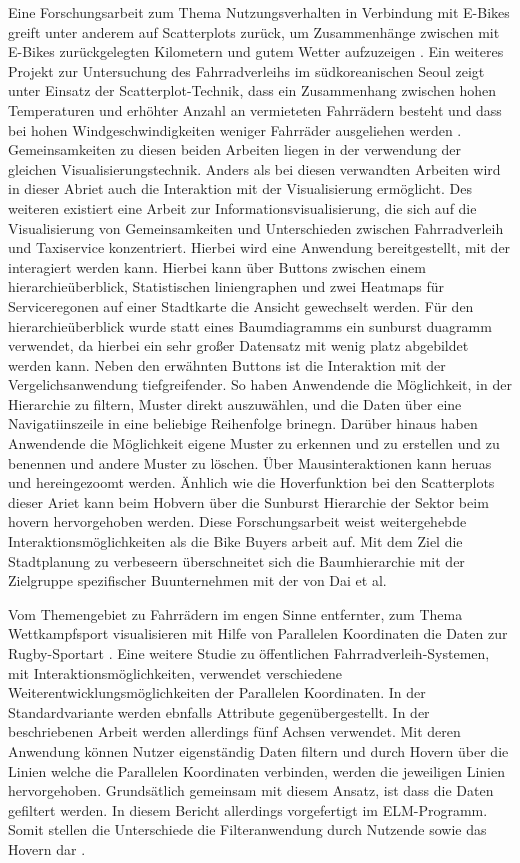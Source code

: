 \documentclass[usegeometry=true]{scrartcl}
\begin{document}
Eine Forschungsarbeit zum Thema Nutzungsverhalten in Verbindung mit E-Bikes greift unter anderem auf Scatterplots zurück, um Zusammenhänge zwischen mit E-Bikes zurückgelegten Kilometern und gutem Wetter aufzuzeigen \cite{Rios.06212016}. Ein weiteres Projekt zur Untersuchung des Fahrradverleihs im südkoreanischen Seoul zeigt unter Einsatz der Scatterplot-Technik, dass ein Zusammenhang zwischen hohen Temperaturen und erhöhter Anzahl an vermieteten Fahrrädern besteht und dass bei hohen Windgeschwindigkeiten weniger Fahrräder ausgeliehen werden \cite{Kashyap.2021}. Gemeinsamkeiten zu diesen beiden Arbeiten liegen in der verwendung der gleichen Visualisierungstechnik. Anders als bei diesen verwandten Arbeiten wird in dieser Abriet auch die Interaktion mit der Visualisierung ermöglicht. 
Des weiteren existiert eine Arbeit zur Informationsvisualisierung, die sich auf die Visualisierung von Gemeinsamkeiten und Unterschieden zwischen Fahrradverleih und Taxiservice konzentriert. Hierbei wird eine Anwendung bereitgestellt, mit der interagiert werden kann. Hierbei kann über Buttons zwischen einem hierarchieüberblick, Statistischen liniengraphen und zwei Heatmaps für Serviceregonen auf einer Stadtkarte die Ansicht gewechselt werden. Für den hierarchieüberblick wurde statt eines Baumdiagramms ein sunburst duagramm verwendet, da hierbei ein sehr großer Datensatz mit wenig platz abgebildet werden kann. Neben den erwähnten Buttons ist die Interaktion mit der Vergelichsanwendung tiefgreifender. So haben Anwendende die Möglichkeit, in der Hierarchie zu filtern, Muster direkt auszuwählen, und die Daten über eine Navigatiinszeile in eine beliebige Reihenfolge brinegn. Darüber hinaus haben Anwendende die Möglichkeit eigene Muster zu erkennen und zu erstellen und zu benennen und andere Muster zu löschen. Über Mausinteraktionen kann heruas und hereingezoomt werden. Änhlich wie die Hoverfunktion bei den Scatterplots dieser Ariet kann beim Hobvern über die Sunburst Hierarchie der Sektor beim hovern hervorgehoben werden. Diese Forschungsarbeit weist weitergehebde Interaktionsmöglichkeiten als die Bike Buyers arbeit auf. Mit dem Ziel die Stadtplanung zu verbeseern überschneitet sich die Baumhierarchie mit der Zielgruppe spezifischer Buunternehmen mit der von Dai et al. \cite{Dai.2020}



Vom Themengebiet zu Fahrrädern im engen Sinne entfernter, zum Thema Wettkampfsport visualisieren mit Hilfe von Parallelen Koordinaten die Daten zur Rugby-Sportart \cite{Du.2021,Chung.2016}.
Eine weitere Studie zu öffentlichen Fahrradverleih-Systemen, mit Interaktionsmöglichkeiten, verwendet verschiedene Weiterentwicklungsmöglichkeiten der  Parallelen Koordinaten. In der Standardvariante werden ebnfalls Attribute gegenübergestellt. In der beschriebenen Arbeit werden allerdings fünf Achsen verwendet. Mit deren Anwendung können Nutzer eigenständig Daten filtern und durch Hovern über die Linien welche die Parallelen Koordinaten verbinden, werden die jeweiligen Linien hervorgehoben. Grundsätlich gemeinsam mit diesem Ansatz, ist dass die Daten gefiltert werden. In diesem Bericht allerdings vorgefertigt im ELM-Programm. Somit stellen die Unterschiede die Filteranwendung durch Nutzende sowie das Hovern dar \cite{Shi.2018}.  
\end{document}
